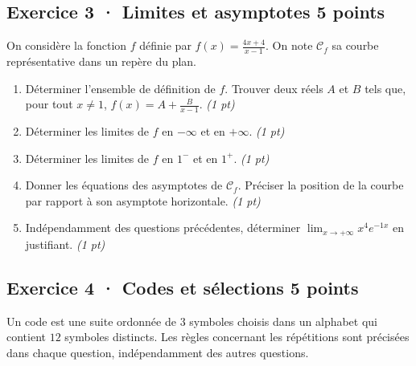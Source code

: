 \clearpage{}\par

\subsection*{Exercice 3 · Limites et asymptotes \hfill 5 points}On considère la fonction $f$ définie par $f(x)=\frac{4x+4}{x-1}$. On note $\mathcal C_f$ sa courbe représentative dans un repère du plan.

\begin{enumerate}

\item Déterminer l'ensemble de définition de $f$. Trouver deux réels $A$ et $B$ tels que, pour tout $x\ne1$, $f(x)=A+\frac B{x-1}$. \hfill\textit{(1 pt)}

\item Déterminer les limites de $f$ en $-\infty$ et en $+\infty$. \hfill\textit{(1 pt)}

\item Déterminer les limites de $f$ en $1^-$ et en $1^+$. \hfill\textit{(1 pt)}

\item Donner les équations des asymptotes de $\mathcal C_f$. Préciser la position de la courbe par rapport à son asymptote horizontale. \hfill\textit{(1 pt)}

\item Indépendamment des questions précédentes, déterminer $\displaystyle\lim_{x\to+\infty}x^{4}e^{-1x}$ en justifiant. \hfill\textit{(1 pt)}

\end{enumerate}

\subsection*{Exercice 4 · Codes et sélections \hfill 5 points}Un code est une suite ordonnée de $3$ symboles choisis dans un alphabet qui contient $12$ symboles distincts. Les règles concernant les répétitions sont précisées dans chaque question, indépendamment des autres questions.

